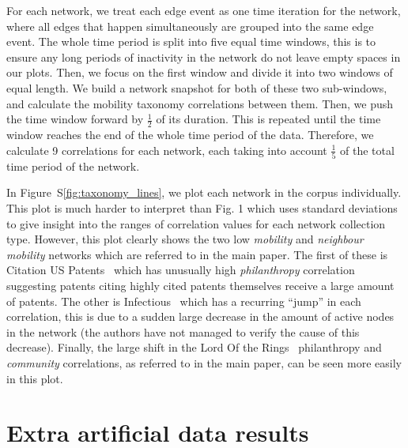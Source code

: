 \documentclass[10pt]{article}
\begin{document}
For each network, we treat each edge event as one time iteration for the network, where all edges that happen simultaneously are grouped into the same edge event. The whole time period is split into five equal time windows, this is to ensure any long periods of inactivity in the network do not leave empty spaces in our plots. Then, we focus on the first window and divide it into two windows of equal length. We build a network snapshot for both of these two sub-windows, and calculate the mobility taxonomy correlations between them. Then, we push the time window forward by $\frac{1}{2}$ of its duration. This is repeated until the time window reaches the end of the whole time period of the data. Therefore, we calculate 9 correlations for each network, each taking into account $\frac{1}{5}$ of the total time period of the network.

In Figure~S\ref{fig:taxonomy_lines}, we plot each network in the corpus individually. This plot is much harder to interpret than Fig. 1 which uses standard deviations to give insight into the ranges of correlation values for each network collection type. However, this plot clearly shows the two low {\it mobility} and {\it neighbour mobility} networks which are referred to in the main paper. The first of these is Citation US Patents~\cite{Hall2001TheTools} which has unusually high {\it philanthropy} correlation suggesting patents citing highly cited patents themselves receive a large amount of patents. The other is Infectious~\cite{Isella2011WhatsNetworks} which has a recurring ``jump'' in each correlation, this is due to a sudden large decrease in the amount of active nodes in the network (the authors have not managed to verify the cause of this decrease). Finally, the large shift in the Lord Of the Rings~\cite{Clegg2009} philanthropy and {\it community} correlations, as referred to in the main paper, can be seen more easily in this plot.

\begin{figure}[!tb]
\end{figure}

\section{Extra artificial data results}
\end{document}
